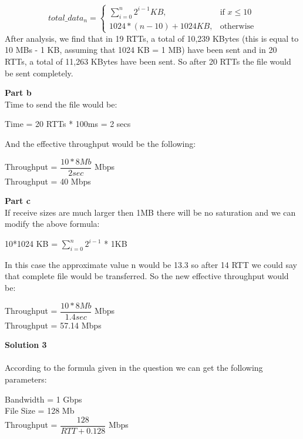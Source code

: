 \documentclass[letterpaper, 11pt]{article}
\begin{document}
\[
    total\_data_n = 
\begin{cases}
    \sum_{i=0}^{n} 2^{i-1} KB,& \text{if } x\le 10\\
    1024*(n-10) + 1024 KB,              & \text{otherwise}
\end{cases}
\]
After analysis, we find that in 19 RTTs, a total of 10,239 KBytes (this is equal to 10 MBs - 1 KB, assuming that 1024 KB = 1 MB) have been sent and in 20 RTTs, a  total  of  11,263  KBytes  have  been  sent.   So  after  20  RTTs  the  file  would  be  sent completely.

\textbf{Part b} \\
Time to send the file would be:
\begin{center}
	Time = 20 RTTs * 100ms = 2 secs
\end{center}
And the effective throughput would be the following:
\begin{center}
Throughput = $\dfrac{10*8 Mb}{2 sec}$ Mbps \\
\leavevmode \newline
Throughput = 40 Mbps
\end{center}
\textbf{Part c} \\
If receive sizes are much larger then 1MB there will be no saturation and we can modify the above formula:
\begin{center}
	10*1024 KB = $\sum_{i=0}^{n} 2^{i-1}$ * 1KB
\end{center}

In this case the approximate value n would be 13.3 so after 14 RTT we could say that complete file would be transferred. So the new effective throughput would be:
\begin{center}
Throughput = $\dfrac{10*8 Mb}{1.4 sec}$ Mbps \\
\leavevmode \newline
Throughput = 57.14 Mbps
\end{center}
\bigskip

\textbf{Solution 3}\\ \\
According to the formula given in the question we can get the following parameters:
\begin{center}
Bandwidth = 1 Gbps \\
\leavevmode \newline 
File Size = 128 Mb \\
\leavevmode \newline 
Throughput = $\dfrac{128}{RTT + 0.128}$ Mbps
\end{center}
\end{document}
